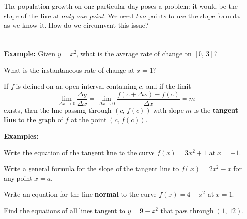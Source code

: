 \newpage

The population growth on one particular day poses a problem: it would be the slope of the line at \textit{only one point}. We need \textit{two} points to use the slope formula as we know it. How do we circumvent this issue?\\
\\
\\
\textbf{Example:} Given $y=x^2$, what is the average rate of change on $[0,\,3]$?


What is the instantaneous rate of change at $x=1$?

\newpage


\begin{tcolorbox}[title= DEFINITION OF TANGENT LINE WITH SLOPE \textit{m},colframe=black,sharp corners,colback=white,colbacktitle=white,coltitle=black,boxrule=1pt]

    If $f$ is defined on an open interval containing $c$, and if the limit
    \[\lim_{\Delta x\to0}\frac{\Delta y}{\Delta x}=\lim_{\Delta x\to0}\frac{f(c+\Delta x)-f(c)}{\Delta x}=m\]
    exists, then the line passing through $(c,\,f(c))$ with slope $m$ is the \textbf{tangent line} to the graph of $f$ at the point $(c,\,f(c))$.
    
\end{tcolorbox}
\vspace{.15cm}
\noindent\textbf{Examples:}
\begin{questions}
    \question Write the equation of the tangent line to the curve $f(x)=3x^2+1$ at $x=-1$. 
    
    \question Write a general formula for the slope of the tangent line to $f(x)=2x^2-x$ for any point $x=a$.
    
    \question Write an equation for the line \textbf{normal} to the curve $f(x)=4-x^2$ at $x=1$.
    
    \question Find the equations of all lines tangent to $y=9-x^2$ that pass through $(1,\,12)$.
\end{questions}


\newpage
